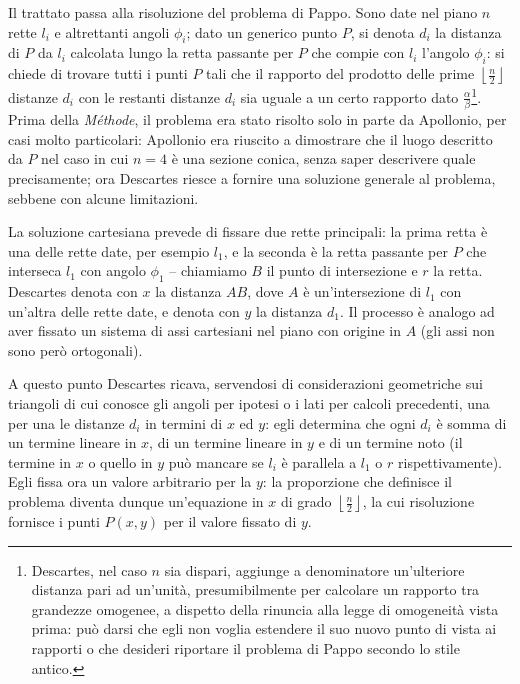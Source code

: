 \par Il trattato passa alla risoluzione del problema di Pappo. Sono date nel piano $n$ rette $l_i$ e altrettanti angoli $\phi_i$; dato un generico punto $P$, si denota $d_i$ la distanza di $P$ da $l_i$ calcolata lungo la retta passante per $P$ che compie con $l_i$ l'angolo $\phi_i$: si chiede di trovare tutti i punti $P$ tali che il rapporto del prodotto delle prime $\left \lfloor \frac{n}{2} \right \rfloor$ distanze $d_i$ con le restanti distanze $d_i$ sia uguale a un certo rapporto dato $\frac{\alpha}{\beta}$\footnote{Descartes, nel caso $n$ sia dispari, aggiunge a denominatore un'ulteriore distanza pari ad un'unit\`a, presumibilmente per calcolare un rapporto tra grandezze omogenee, a dispetto della rinuncia alla legge di omogeneit\`a vista prima: pu\`o darsi che egli non voglia estendere il suo nuovo punto di vista ai rapporti o che desideri riportare il problema di Pappo secondo lo stile antico.}. Prima della \textit{M\'ethode}, il problema era stato risolto solo in parte da Apollonio, per casi molto particolari: Apollonio era riuscito a dimostrare che il luogo descritto da $P$ nel caso in cui $n = 4$ \`e una sezione conica, senza saper descrivere quale precisamente; ora Descartes riesce a fornire una soluzione generale al problema, sebbene con alcune limitazioni.
\par La soluzione cartesiana prevede di fissare due rette principali: la prima retta \`e una delle rette date, per esempio $l_1$, e la seconda \`e la retta passante per $P$ che interseca $l_1$ con angolo $\phi_1$ -- chiamiamo $B$ il punto di intersezione e $r$ la retta. Descartes denota con $x$ la distanza $AB$, dove $A$ \`e un'intersezione di $l_1$ con un'altra delle rette date, e denota con $y$ la distanza $d_1$. Il processo \`e analogo ad aver fissato un sistema di assi cartesiani nel piano con origine in $A$ (gli assi non sono per\`o ortogonali).
\par A questo punto Descartes ricava, servendosi di considerazioni geometriche sui triangoli di cui conosce gli angoli per ipotesi o i lati per calcoli precedenti, una per una le distanze $d_i$ in termini di $x$ ed $y$: egli determina che ogni $d_i$ \`e somma di un termine lineare in $x$, di un termine lineare in $y$ e di un termine noto (il termine in $x$ o quello in $y$ pu\`o mancare se $l_i$ \`e parallela a $l_1$ o $r$ rispettivamente). Egli fissa ora un valore arbitrario per la $y$: la proporzione che definisce il problema diventa dunque un'equazione in $x$ di grado $\left \lfloor \frac{n}{2} \right \rfloor$, la cui risoluzione fornisce i punti $P(x,y)$ per il valore fissato di $y$.
